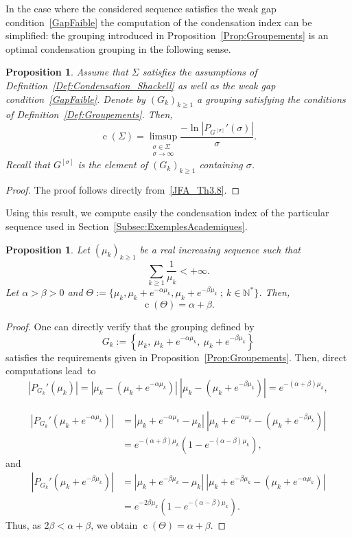 \documentclass[11pt]{article}
\newtheorem{prop}[theo]{Proposition}
\theoremstyle{definition}
\numberwithin{equation}{section}
\numberwithin{figure}{section}
\numberwithin{table}{section}
\newcommand{\N}{\mathbb{N}}
\DeclareMathOperator{\cond}{c}
\begin{document}
In the case where the considered sequence satisfies the weak gap condition~\eqref{GapFaible} the computation of the condensation index can be simplified: the grouping introduced in Proposition~\ref{Prop:Groupements} is an optimal condensation grouping in the following sense.

\begin{prop}\label{Prop:CondensationGapParBloc}
Assume that $\Sigma$ satisfies the assumptions of Definition~\ref{Def:Condensation_Shackell} as well as the weak gap condition~\eqref{GapFaible}. Denote by $(G_k)_{k \geq 1}$ a grouping satisfying the conditions of Definition~\ref{Def:Groupements}. Then,
\[
\cond(\Sigma) = \limsup_{\substack{\sigma \in \Sigma \\ \sigma \to \infty}} \frac{- \ln |P_{G^{[\sigma]}}'(\sigma)| }{\sigma}.
\]
Recall that $G^{[\sigma]}$ is the element of $(G_k)_{k \geq 1}$ containing $\sigma$.
\end{prop}


\begin{proof}
The proof follows directly from~\eqref{JFA_Th3.8}.
\end{proof}


Using this result, we compute easily the condensation index of the particular sequence used in Section~\ref{Subsec:ExemplesAcademiques}.
\begin{prop}
Let $(\mu_k)_{k \geq 1}$ be a real increasing sequence such that
\[
\sum_{k \geq 1} \frac{1}{\mu_k} < + \infty.
\]
Let $\alpha >\beta >0$ and $\Theta := \{ \mu_k, \mu_k + e^{-\alpha \mu_k}, \mu_k + e^{-\beta \mu_k} \: ; \: k \in \N^* \}$. Then,
\[
\cond(\Theta) = \alpha + \beta.
\]
\end{prop}

\begin{proof}
One can directly verify that the grouping defined by
\[
G_k := \left\{ \mu_k, \: \mu_k + e^{-\alpha \mu_k}, \: \mu_k + e^{-\beta \mu_k} \right\}
\]
satisfies the requirements given in Proposition~\ref{Prop:Groupements}. Then, direct computations lead~to
\[
\left|P_{G_k}'(\mu_k)\right| = \left|\mu_k - \left(\mu_k + e^{-\alpha \mu_k}\right)\right| \: \left| \mu_k - \left(\mu_k + e^{-\beta \mu_k}\right)\right| = e^{-(\alpha+\beta) \mu_k},
\]


\begin{align*}
\left|P_{G_k}'\left(\mu_k+ e^{-\alpha \mu_k}\right)\right| &= \left|\mu_k+ e^{-\alpha \mu_k}- \mu_k\right| \: \left| \mu_k+ e^{-\alpha \mu_k} - \left(\mu_k + e^{-\beta \mu_k}\right)\right|
\\
&= e^{-(\alpha+\beta) \mu_k} \left(1 - e^{-(\alpha-\beta)\mu_k} \right),
\end{align*}
and
\begin{align*}
\left|P_{G_k}'\left(\mu_k+ e^{-\beta \mu_k}\right)\right| &= \left|\mu_k+ e^{-\beta \mu_k}- \mu_k\right| \: \left| \mu_k+ e^{-\beta \mu_k} - \left(\mu_k + e^{-\alpha \mu_k}\right)\right|
\\
&= e^{-2\beta \mu_k} \left(1 - e^{-(\alpha-\beta)\mu_k} \right).
\end{align*}
Thus, as $2 \beta < \alpha+ \beta$, we obtain $\cond(\Theta) = \alpha + \beta$.
\end{proof}
\end{document}
